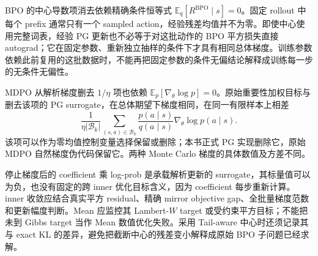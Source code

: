 BPO 的中心导数项消去依赖精确条件恒等式 $\mathbb E_q[R^{\mathrm{BPO}}\mid s]=0$。固定 rollout 中每个 prefix 通常只有一个 sampled action，经验残差均值并不为零。即使中心使用完整词表，经验 PG 更新也不必等于对这批动作的 BPO 平方损失直接 autograd；它在固定参数、重新独立抽样的条件下才具有相同总体梯度。训练参数依赖此前复用的这批数据时，不能再把固定参数的条件无偏结论解释成训练每一步的无条件无偏性。

MDPO 从解析梯度删去 $1/\eta$ 项也依赖 $\mathbb E_{p}[\nabla_\theta\log p]=0$。原始重要性加权目标与删去该项的 PG surrogate，在总体期望下梯度相同，在同一有限样本上相差
\[
 \frac1{\eta|\mathcal B_k|}\sum_{(s,a)\in\mathcal B_k}
 \frac{p(a\mid s)}{q(a\mid s)}\nabla_\theta\log p(a\mid s).
\]
该项可以作为零均值控制变量选择保留或删除；本书正式 PG 实现删除它，原始 MDPO 自然梯度伪代码保留它。两种 Monte Carlo 梯度的具体数值及方差不同。

停止梯度后的 coefficient 乘 log-prob 是承载解析更新的 surrogate，其标量值可以为负，也没有固定的跨 inner 优化目标含义，因为 coefficient 每步重新计算。inner 收敛应结合真实平方 residual、精确 mirror objective gap、全批量梯度范数和更新幅度判断。Mean 应监控其 Lambert-$W$ target 或受约束平方目标；不能把未到 Gibbs target 当作 Mean 数值优化失败。采用 Tail-aware 中心时还须记录其与 exact KL 的差异，避免把截断中心的残差变小解释成原始 BPO 子问题已经求解。


